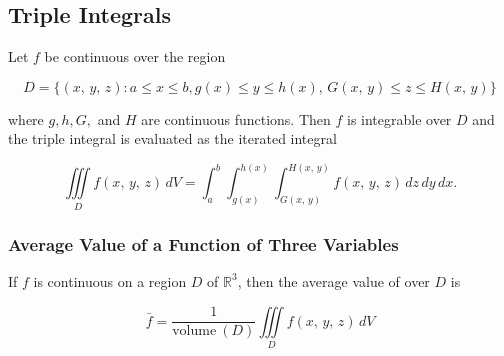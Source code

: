 \subsection{Triple Integrals}
Let $f$ be continuous over the region

\begin{equation}
    D = \{ (x,\, y,\, z): a \leq x \leq b, g(x) \leq y \leq h(x),\, G(x,\, y) \leq z \leq H(x,\, y) \}
\end{equation}

where $g, h, G,$ and $H$ are continuous functions. Then $f$ is integrable over $D$ and the triple integral is evaluated as the iterated integral

\begin{equation}
    \iiint \limits _D f(x,\, y,\, z) \,dV = \int _a ^b \int _{g(x)} ^{h(x)} \int _{G(x,\, y)} ^{H(x,\, y)} f(x,\, y,\, z) \,dz\,dy\,dx.
\end{equation}

\subsubsection{Average Value of a Function of Three Variables}
If $f$ is continuous on a region $D$ of $\mathbb{R}^3$, then the average value of over $D$ is

\begin{equation}
    \bar{f} = \frac{1}{\text{volume}\ (D)} \iiint \limits _D f(x,\, y,\, z) \,dV
\end{equation}
